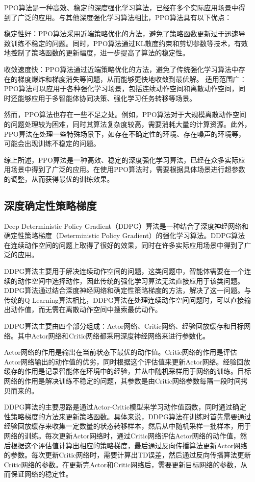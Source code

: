 PPO算法是一种高效、稳定的深度强化学习算法，已经在多个实际应用场景中得到了广泛的应用。与其他深度强化学习算法相比，PPO算法具有以下优点：

稳定性好：PPO算法采用近端策略优化的方法，避免了策略函数更新过于迅速导致训练不稳定的问题。同时，PPO算法通过KL散度约束和剪切参数等技术，有效地控制了策略函数的更新幅度，进一步提高了算法的稳定性。

收敛速度快：PPO算法通过近端策略优化的方法，避免了传统强化学习算法中存在的梯度爆炸和梯度消失等问题，从而能够更快地收敛到最优解。
适用范围广：PPO算法可以应用于各种强化学习场景，包括连续动作空间和离散动作空间，同时还能够应用于多智能体协同决策、强化学习任务转移等场景。

然而，PPO算法也存在一些不足之处。例如，PPO算法对于大规模离散动作空间的问题处理较为困难，同时其算法复杂度较高，需要消耗大量的计算资源。此外，PPO算法在处理一些特殊场景下，如存在不确定性的环境、存在噪声的环境等，可能会出现训练不稳定的问题。

综上所述，PPO算法是一种高效、稳定的深度强化学习算法，已经在众多实际应用场景中得到了广泛的应用。在使用PPO算法时，需要根据具体场景进行超参数的调整，从而获得最优的训练效果。


\subsection{深度确定性策略梯度}

Deep Deterministic Policy Gradient（DDPG）算法是一种结合了深度神经网络和确定性策略梯度（Deterministic Policy Gradient）的强化学习算法。DDPG算法在连续动作空间的问题上取得了很好的效果，同时在许多实际应用场景中得到了广泛的应用。

DDPG算法主要用于解决连续动作空间的问题，这类问题中，智能体需要在一个连续的动作空间中选择动作，因此传统的强化学习算法无法直接应用于该类问题。DDPG算法通过结合深度神经网络和确定性策略梯度的方法，解决了这一问题。与传统的Q-Learning算法相比，DDPG算法在处理连续动作空间问题时，可以直接输出动作值，而无需在离散动作空间中搜索最优动作。

DDPG算法主要由四个部分组成：Actor网络、Critic网络、经验回放缓存和目标网络。其中Actor网络和Critic网络都采用深度神经网络来进行参数化。

Actor网络的作用是输出在当前状态下最优的动作值。Critic网络的作用是评估Actor网络输出的动作值的优劣，同时根据这个评估值来更新Actor网络。经验回放缓存的作用是记录智能体在环境中的经验，并从中随机采样用于网络的训练。目标网络的作用是解决训练不稳定的问题，其参数是由Critic网络参数每隔一段时间拷贝而来的。

DDPG算法的主要思路是通过Actor-Critic模型来学习动作值函数，同时通过确定性策略梯度的方法来更新策略函数。具体来说，DDPG算法在训练时首先需要通过经验回放缓存来收集一定数量的状态转移样本，然后从中随机采样一批样本，用于网络的训练。每次更新Actor网络时，通过Critic网络评估Actor网络的动作值，然后根据这个评估值计算出相应的策略梯度，最后通过反向传播算法更新Actor网络的参数。每次更新Critic网络时，需要计算出TD误差，然后通过反向传播算法更新Critic网络的参数。在更新完Actor和Critic网络后，需要更新目标网络的参数，从而保证网络的稳定性。

